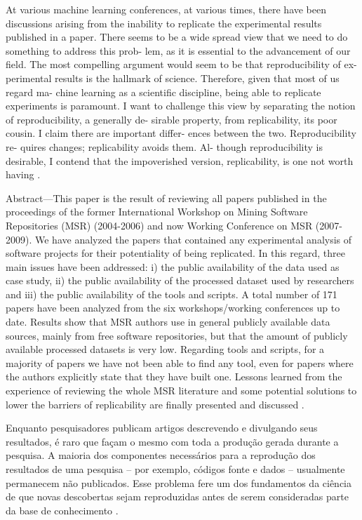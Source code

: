 At various machine learning conferences, at
various times, there have been discussions
arising from the inability to replicate the
experimental results published in a paper.
There seems to be a wide spread view that we
need to do something to address this prob-
lem, as it is essential to the advancement
of our field. The most compelling argument
would seem to be that reproducibility of ex-
perimental results is the hallmark of science.
Therefore, given that most of us regard ma-
chine learning as a scientific discipline, being
able to replicate experiments is paramount.
I want to challenge this view by separating
the notion of reproducibility, a generally de-
sirable property, from replicability, its poor
cousin. I claim there are important differ-
ences between the two. Reproducibility re-
quires changes; replicability avoids them. Al-
though reproducibility is desirable, I contend
that the impoverished version, replicability,
is one not worth having \cite{drummond2009replicability}.

Abstract—This paper is the result of reviewing all papers
published in the proceedings of the former International
Workshop on Mining Software Repositories (MSR) (2004-2006)
and now Working Conference on MSR (2007-2009). We have
analyzed the papers that contained any experimental analysis
of software projects for their potentiality of being replicated.
In this regard, three main issues have been addressed: i) the
public availability of the data used as case study, ii) the public
availability of the processed dataset used by researchers and iii)
the public availability of the tools and scripts. A total number of
171 papers have been analyzed from the six workshops/working
conferences up to date. Results show that MSR authors use
in general publicly available data sources, mainly from free
software repositories, but that the amount of publicly available
processed datasets is very low. Regarding tools and scripts, for
a majority of papers we have not been able to find any tool,
even for papers where the authors explicitly state that they have
built one. Lessons learned from the experience of reviewing the
whole MSR literature and some potential solutions to lower the
barriers of replicability are finally presented and discussed
\cite{robles2010replicating}.



Enquanto pesquisadores publicam artigos descrevendo e divulgando seus
resultados, é raro que façam o mesmo com toda a produção gerada durante a
pesquisa. A maioria dos componentes necessários para a reprodução dos
resultados de uma pesquisa -- por exemplo, códigos fonte e dados -- usualmente
permanecem não publicados. Esse problema fere um dos fundamentos
da ciência de que novas descobertas sejam reproduzidas antes de serem
consideradas parte da base de conhecimento \cite{Stodden2009}.

